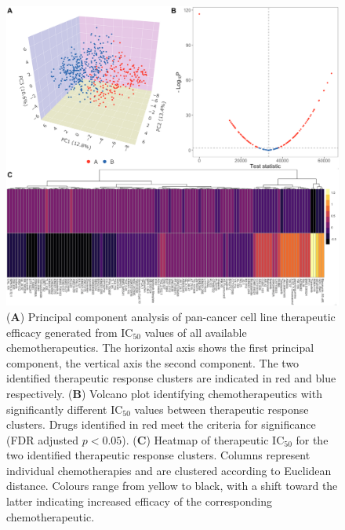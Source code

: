 \documentclass[10pt, letterpaper, twocolumn]{article}
\begin{document}
\begin{figure}[!ht]
    \centering
    \includegraphics[width=\textwidth]{Figures/clustering.png}

    \caption{(\textbf{A}) Principal component analysis of pan-cancer cell line therapeutic efficacy generated from IC$_{50}$ values of all available chemotherapeutics. The horizontal axis shows the first principal component, the vertical axis the second component. The two identified therapeutic response clusters are indicated in red and blue respectively. (\textbf{B}) Volcano plot identifying chemotherapeutics with significantly different IC$_{50}$ values between therapeutic response clusters. Drugs identified in red meet the criteria for significance (FDR adjusted $p<0.05$). (\textbf{C}) Heatmap of therapeutic IC$_{50}$ for the two identified therapeutic response clusters. Columns represent individual chemotherapies and are clustered according to Euclidean distance. Colours range from yellow to black, with a shift toward the latter indicating increased efficacy of the corresponding chemotherapeutic.}
    \label{fig:clustering}
\end{figure}
\end{document}
